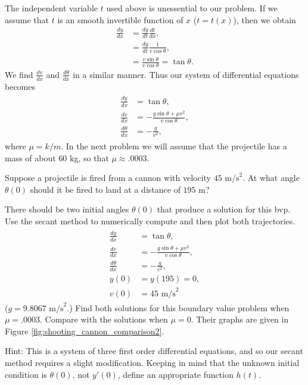 The independent variable $t$ used above is unessential to our problem.
If we assume that $t$ is an smooth invertible function of $x$ ($t = t(x)$), then we obtain
\begin{align*}
\frac{dy}{dx} &= \frac{dy}{dt}\frac{dt}{dx} ,\\
&= \frac{dy}{dt} \frac{1}{v\cos{\theta}}, \\
&= \frac{v \sin{\theta}}{v\cos{\theta}} = \tan{\theta}.
\end{align*}
We find $\frac{dv}{dx}$ and $\frac{d\theta}{dx}$ in a similar manner.
Thus our system of differential equations becomes
\begin{align}
	\begin{split}
\frac{dy}{dx} &= \tan {\theta} ,\\
\frac{dv}{dx} &= -\frac{g \sin{\theta} + \mu v^2}{v \cos{\theta}},\\
\frac{d\theta}{dx} &= -\frac{g}{v^2}, \label{eqn:cannon_DEs}
	\end{split}
\end{align}
where $\mu = k/m.$
In the next problem we will assume that the projectile has a mass of about $60$ kg, so that $\mu \approx .0003$.

\begin{problem}
Suppose a projectile is fired from a cannon with velocity $45\text{ m/s}^2$.
At what angle $\theta(0)$ should it be fired to land at a distance of $195\text{ m}$?

There should be two initial angles $\theta(0)$ that produce a solution for this bvp.
Use the secant method to numerically compute and then plot both trajectories.
\begin{align}
	\label{eqn:cannon_shooting}
	\begin{split}
\frac{dy}{dx} &= \tan {\theta} ,\\
\frac{dv}{dx} &= -\frac{g \sin{\theta} + \mu v^2}{v \cos{\theta}},\\
\frac{d\theta}{dx} &= -\frac{g}{v^2},\\
y(0)&= y(195) = 0,\\
v(0) &= 45 \text{ m/s}^2
	\end{split}
\end{align}
($g = 9.8067\text{ m/s}^2$.)
Find both solutions for this boundary value problem when $\mu = .0003$.
Compare with the solutions when $\mu = 0.$
Their graphs are given in Figure \ref{fig:shooting_cannon_comparison2}.

Hint: This is a system of three first order differential equations, and so our secant method requires a slight modification.
Keeping in mind that the unknown initial condition is $\theta(0)$, not $y'(0)$, define an appropriate function $h(t)$.
\end{problem}

